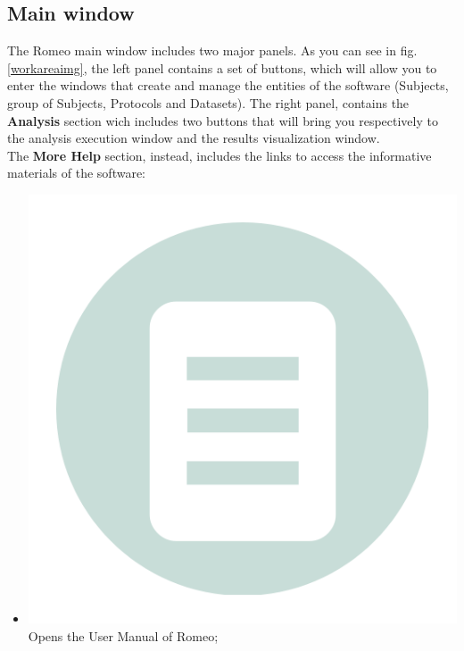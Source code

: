 \subsection{Main window}
\label{mainwindow}
The Romeo main window includes two major panels. As you can see in fig. \ref{workareaimg}, the left panel contains a set of buttons, which will allow you to enter the windows that create and manage the entities of the software (Subjects\g{}, group of Subjects\g{}, Protocols\g{} and Datasets\g{}). The right panel, contains the \textbf{Analysis} section wich includes two buttons that will bring you respectively to the analysis execution window and the results visualization window.\\
The \textbf{More Help} section, instead, includes the links to access the informative materials of the software:
\begin{itemize}
\item \includegraphics[scale=0.06]{./Images/manual} Opens the User Manual of Romeo;

\end{itemize}
